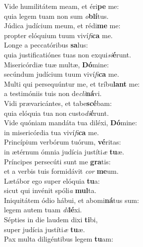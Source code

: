 \oddverse Vide humilitátem meam, et éri\textbf{pe} me:~\*\\
\oddverse quia legem tuam non sum \textit{o}\textbf{blí}tus.\\
\evenverse Júdica judícium meum, et rédi\textbf{me} me:~\*\\
\evenverse propter elóquium tuum viví\textit{fi}\textbf{ca} me.\\
\oddverse Longe a peccatóribus \textbf{sa}lus:~\*\\
\oddverse quia justificatiónes tuas non exqui\textit{si}\textbf{é}runt.\\
\evenverse Misericórdiæ tuæ multæ, \textbf{Dó}mine:~\*\\
\evenverse secúndum judícium tuum viví\textit{fi}\textbf{ca} me.\\
\oddverse Multi qui persequúntur me, et tríbu\textbf{lant} me:~\*\\
\oddverse a testimóniis tuis non de\textit{cli}\textbf{ná}vi.\\
\evenverse Vidi prævaricántes, et tabe\textbf{scé}bam:~\*\\
\evenverse quia elóquia tua non custo\textit{di}\textbf{é}runt.\\
\oddverse Vide quóniam mandáta tua diléxi, \textbf{Dó}mine:~\*\\
\oddverse in misericórdia tua viví\textit{fi}\textbf{ca} me.\\
\evenverse Princípium verbórum tuórum, \textbf{vé}ritas:~\*\\
\evenverse in ætérnum ómnia judícia justíti\textit{æ} \textbf{tu}æ.\\
\oddverse Príncipes persecúti sunt me \textbf{gra}tis:~\*\\
\oddverse et a verbis tuis formidávit \textit{cor} \textbf{me}um.\\
\evenverse Lætábor ego super elóquia \textbf{tu}a:~\*\\
\evenverse sicut qui invénit spóli\textit{a} \textbf{mul}ta.\\
\oddverse Iniquitátem ódio hábui, et abomi\textbf{ná}tus sum:~\*\\
\oddverse legem autem tuam \textit{di}\textbf{lé}xi.\\
\evenverse Sépties in die laudem dixi \textbf{ti}bi,~\*\\
\evenverse super judícia justíti\textit{æ} \textbf{tu}æ.\\
\oddverse Pax multa diligéntibus legem \textbf{tu}am:~\*\\
